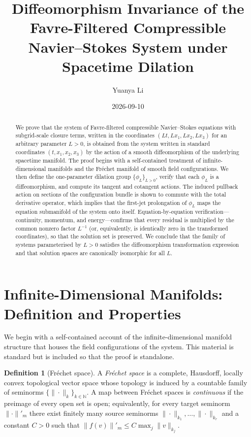 \documentclass[11pt]{article}
\title{\bfseries Diffeomorphism Invariance of the Favre-Filtered Compressible
Navier--Stokes System under Spacetime Dilation}
\author{Yuanya Li}
\date{2026-09-10}
\theoremstyle{definition}
\newtheorem{definition}[theorem]{Definition}
\theoremstyle{remark}
\newcommand{\N}{\mathbb{N}}
\begin{document}
\maketitle

\begin{abstract}
We prove that the system of Favre-filtered compressible Navier--Stokes
equations with subgrid-scale closure terms, written in the coordinates
$(Lt,Lx_1,Lx_2,Lx_3)$ for an arbitrary parameter $L>0$, is obtained from the
system written in standard coordinates $(t,x_1,x_2,x_3)$ by the action of a
smooth diffeomorphism of the underlying spacetime manifold.  The proof begins
with a self-contained treatment of infinite-dimensional manifolds and the
Fr\'echet manifold of smooth field configurations.  We then define the
one-parameter dilation group $\{\phi_L\}_{L>0}$, verify that each $\phi_L$ is
a diffeomorphism, and compute its tangent and cotangent actions.  The induced
pullback action on sections of the configuration bundle is shown to commute
with the total derivative operator, which implies that the first-jet
prolongation of $\phi_L$ maps the equation submanifold of the system onto
itself.  Equation-by-equation verification---continuity, momentum, and
energy---confirms that every residual is multiplied by the common nonzero
factor $L^{-1}$ (or, equivalently, is identically zero in the transformed
coordinates), so that the solution set is preserved.  We conclude that the
family of systems parameterised by $L>0$ satisfies the diffeomorphism
transformation expression and that solution spaces are canonically isomorphic
for all $L$.
\end{abstract}

\tableofcontents

\section{Infinite-Dimensional Manifolds: Definition and Properties}
\label{sec:infdim}

We begin with a self-contained account of the infinite-dimensional manifold
structure that houses the field configurations of the system.  This material
is standard but is included so that the proof is standalone.

\begin{definition}[Fr\'echet space]
A \emph{Fr\'echet space} is a complete, Hausdorff, locally convex topological
vector space whose topology is induced by a countable family of seminorms
$\{\|\cdot\|_k\}_{k\in\N}$.  A map between Fr\'echet spaces is
\emph{continuous} if the preimage of every open set is open; equivalently, for
every target seminorm $\|\cdot\|'_m$ there exist finitely many source
seminorms $\|\cdot\|_{k_1},\dots,\|\cdot\|_{k_r}$ and a constant $C>0$ such
that $\|f(v)\|'_m\le C\max_j\|v\|_{k_j}$.
\end{definition}
\end{document}
